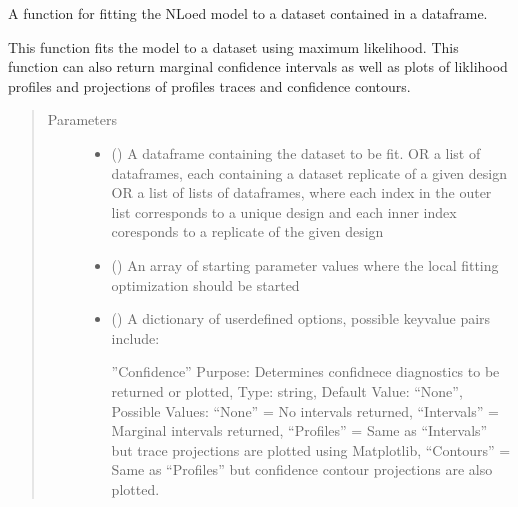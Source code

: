 \documentclass[letterpaper,10pt,english,openany,oneside]{sphinxmanual}
\begin{document}
\begin{fulllineitems}

\begin{fulllineitems}
\label{\detokenize{nloed:nloed.model.Model.fit}}
A function for fitting the NLoed model to a dataset contained in a dataframe.

This function fits the model to a dataset using maximum likelihood. This function can also
return marginal confidence intervals as well as plots of liklihood profiles and projections
of profiles traces and confidence contours.
\begin{quote}\begin{description}
\item[{Parameters}] \leavevmode\begin{itemize}
\item {} 
 () \textendash{} A dataframe containing the dataset to be fit.
OR a list of dataframes, each containing a dataset replicate of a given design
OR a list of lists of dataframes, where each index in the outer list corresponds
to a unique design and each inner index coresponds to a replicate of the given design

\item {} 
 (\sphinxstyleliteralemphasis{\sphinxupquote{, }}) \textendash{} An array of starting parameter values where the
local fitting optimization should be started

\item {} 
 (\sphinxstyleliteralemphasis{\sphinxupquote{, }}) \textendash{} 
A dictionary of user\sphinxhyphen{}defined options, possible key\sphinxhyphen{}value pairs
include:

”Confidence” \textendash{}
Purpose: Determines confidnece diagnostics to be returned or plotted,
Type: string,
Default Value: “None”,
Possible Values:
“None” = No intervals returned,
“Intervals” = Marginal intervals returned,
“Profiles” = Same as “Intervals” but trace projections are plotted using Matplotlib,
“Contours” = Same as  “Profiles” but confidence contour projections are also plotted.


\end{itemize}
\end{description}
\end{quote}
\end{fulllineitems}
\end{fulllineitems}
\end{document}
